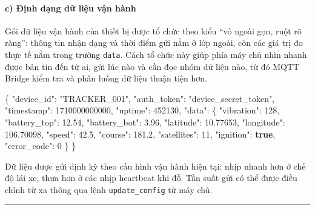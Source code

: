 \documentclass[a4paper]{extarticle}
\newenvironment{Shaded}{}{}
\newcommand{\DataTypeTok}[1]{\textcolor[rgb]{0.56,0.13,0.00}{#1}}
\newcommand{\DecValTok}[1]{\textcolor[rgb]{0.25,0.63,0.44}{#1}}
\newcommand{\FloatTok}[1]{\textcolor[rgb]{0.25,0.63,0.44}{#1}}
\newcommand{\FunctionTok}[1]{\textcolor[rgb]{0.02,0.16,0.49}{#1}}
\newcommand{\KeywordTok}[1]{\textcolor[rgb]{0.00,0.44,0.13}{\textbf{#1}}}
\newcommand{\StringTok}[1]{\textcolor[rgb]{0.25,0.44,0.63}{#1}}
\begin{document}
\paragraph{c) Định dạng dữ liệu
vận hành}\label{c-ux111ux1ecbnh-dux1ea1ng-dux1eef-liux1ec7u-telemetry}

Gói dữ liệu vận hành của thiết bị được tổ chức theo kiểu ``vỏ ngoài gọn,
ruột rõ ràng'': thông tin nhận dạng và thời điểm gửi nằm ở lớp ngoài,
còn các giá trị đo thực tế nằm trong trường \texttt{data}. Cách tổ chức
này giúp phía máy chủ nhìn nhanh được bản tin đến từ ai, gửi lúc nào và
cần đọc nhóm dữ liệu nào, từ đó MQTT Bridge kiểm tra và phân luồng dữ
liệu thuận tiện hơn.

\begin{Shaded}
\begin{Highlighting}[]
\FunctionTok{\{}
  \DataTypeTok{"device\_id"}\FunctionTok{:} \StringTok{"TRACKER\_001"}\FunctionTok{,}
  \DataTypeTok{"auth\_token"}\FunctionTok{:} \StringTok{"device\_secret\_token"}\FunctionTok{,}
  \DataTypeTok{"timestamp"}\FunctionTok{:} \DecValTok{1710000000000}\FunctionTok{,}
  \DataTypeTok{"uptime"}\FunctionTok{:} \DecValTok{452130}\FunctionTok{,}
  \DataTypeTok{"data"}\FunctionTok{:} \FunctionTok{\{}
    \DataTypeTok{"vibration"}\FunctionTok{:} \DecValTok{128}\FunctionTok{,}
    \DataTypeTok{"battery\_top"}\FunctionTok{:} \FloatTok{12.54}\FunctionTok{,}
    \DataTypeTok{"battery\_bot"}\FunctionTok{:} \FloatTok{3.96}\FunctionTok{,}
    \DataTypeTok{"latitude"}\FunctionTok{:} \FloatTok{10.77653}\FunctionTok{,}
    \DataTypeTok{"longitude"}\FunctionTok{:} \FloatTok{106.70098}\FunctionTok{,}
    \DataTypeTok{"speed"}\FunctionTok{:} \FloatTok{42.5}\FunctionTok{,}
    \DataTypeTok{"course"}\FunctionTok{:} \FloatTok{181.2}\FunctionTok{,}
    \DataTypeTok{"satellites"}\FunctionTok{:} \DecValTok{11}\FunctionTok{,}
    \DataTypeTok{"ignition"}\FunctionTok{:} \KeywordTok{true}\FunctionTok{,}
    \DataTypeTok{"error\_code"}\FunctionTok{:} \DecValTok{0}
  \FunctionTok{\}}
\FunctionTok{\}}
\end{Highlighting}
\end{Shaded}

Dữ liệu được gửi định kỳ theo cấu hình vận hành hiện tại: nhịp nhanh hơn
ở chế độ lái xe, thưa hơn ở các nhịp heartbeat khi đỗ. Tần suất gửi có
thể được điều chỉnh từ xa thông qua lệnh \texttt{update\_config} từ
máy chủ.

\begin{center}\rule{0.5\linewidth}{0.5pt}\end{center}
\end{document}
